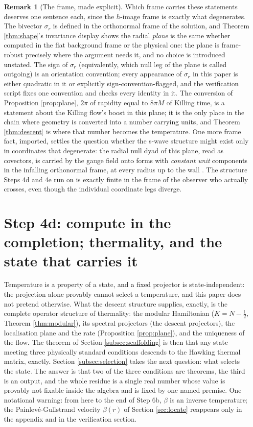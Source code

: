 \documentclass[11pt]{article}
\theoremstyle{definition}
\newtheorem{remark}[theorem]{Remark}
\newcommand{\hb}{\bar{h}}
\begin{document}
\begin{remark}[The frame, made explicit]\label{rem:frame}
Which frame carries these statements deserves one sentence each, since the $\hb$-image frame is exactly what degenerates. The bivector $\sigma_r$ is defined in the orthonormal frame of the solution, and Theorem \ref{thm:shape}'s invariance display shows the radial \emph{plane} is the same whether computed in the flat background frame or the physical one: the plane is frame-robust precisely where the argument needs it, and no choice is introduced unstated. The sign of $\sigma_r$ (equivalently, which null leg of the plane is called outgoing) is an orientation convention; every appearance of $\sigma_r$ in this paper is either quadratic in it or explicitly sign-convention-flagged, and the verification script fixes one convention and checks every identity in it. The conversion of Proposition \ref{prop:plane}, $2\pi$ of rapidity equal to $8\pi M$ of Killing time, is a statement about the Killing flow's boost in this plane; it is the only place in the chain where geometry is converted into a number carrying units, and Theorem \ref{thm:descent} is where that number becomes the temperature. One more frame fact, imported, settles the question whether the s-wave structure might exist only in coordinates that degenerate: the radial null dyad of this plane, read as covectors, is carried by the gauge field onto forms with \emph{constant unit} components in the infalling orthonormal frame, at every radius up to the wall \cite[Prop.~8.23, Rem.~8.24]{ButlerT4}.
The structure Steps 4d and 4e run on is exactly finite in the frame of the observer who actually crosses, even though the individual coordinate legs diverge.
\end{remark}

\section{Step 4d: compute in the completion; thermality, and the state that carries it}\label{sec:thermal}

Temperature is a property of a state, and a fixed projector is state-independent: the projection alone provably cannot select a temperature, and this paper does not pretend otherwise. What the descent structure supplies, exactly, is the complete operator structure of thermality: the modular Hamiltonian ($K = N - \tfrac12$, Theorem \ref{thm:modular}), its spectral projectors (the descent projectors), the localisation plane and the rate (Proposition \ref{prop:plane}), and the uniqueness of the flow. The theorem of Section \ref{subsec:scaffolding} is then that any state meeting three physically standard conditions descends to the Hawking thermal matrix, exactly. Section \ref{subsec:selection} takes the next question: what selects the state. The answer is that two of the three conditions are theorems, the third is an output, and the whole residue is a single real number whose value is provably not fixable inside the algebra and is fixed by one named premise. One notational warning: from here to the end of Step 6b, $\beta$ is an inverse temperature; the Painlev\'e-Gullstrand velocity $\beta(r)$ of Section \ref{sec:locate} reappears only in the appendix and in the verification section.
\end{document}
